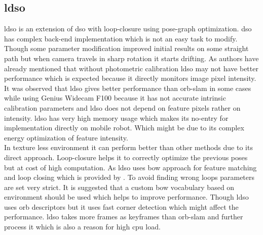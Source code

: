 \subsection{\acrshort{ldso}}
\acrshort{ldso} is an extension of \acrshort{dso} with loop-closure using pose-graph optimization. \acrshort{dso} has complex back-end implementation which is not an easy task to modify. Though some parameter modification improved initial results on some straight path but when camera travels in sharp rotation it starts drifting. As authors have already mentioned \cite{yang2018challenges} that without photometric calibration \acrshort{ldso} may not have better performance which is expected because it directly monitors image pixel intensity.\\
\newline It was observed that \acrshort{ldso} gives better performance than \acrshort{orb}-\acrshort{slam} in some cases while using Genius Widecam F100 because it has not accurate intrinsic calibration parameters and \acrshort{ldso} does not depend on feature pixels rather on intensity. \acrshort{ldso} has very high memory usage which makes its no-entry for implementation directly on mobile robot. Which might be due to its complex energy optimization of feature intensity.\\
\newline In texture less environment it can perform better than other methods due to its direct approach. Loop-closure helps it to correctly optimize the previous poses but at cost of high computation. As \acrshort{ldso} uses \acrlong{bow} approach for feature matching and loop closing which is provided by \cite{DboW}. To avoid finding wrong loops parameters are set very strict. It is suggested that a custom \acrlong{bow} vocabulary based on environment should be used which helps to improve performance. Though \acrshort{ldso} uses \acrshort{orb} descriptors but it uses \acrshort{fast} corner detection which might affect the performance. \acrshort{ldso} takes more frames as keyframes than \acrshort{orb}-\acrshort{slam} and further process it which is also a reason for high \acrshort{cpu} load.

